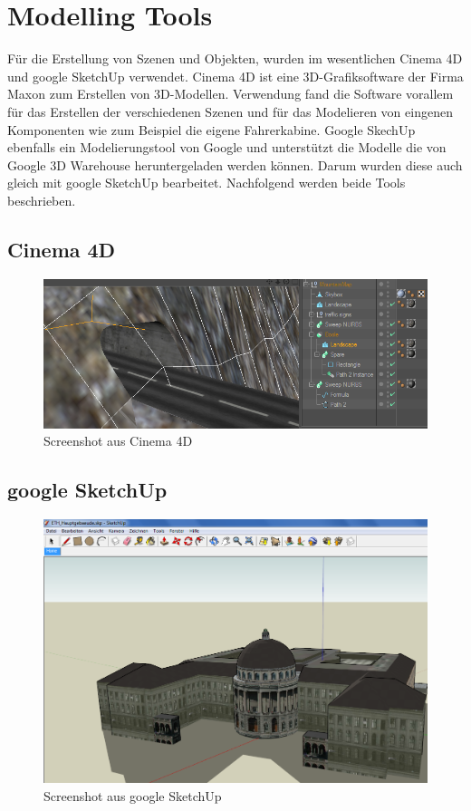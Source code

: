 \section{Modelling Tools}
Für die Erstellung von Szenen und Objekten, wurden im wesentlichen Cinema 4D und google SketchUp verwendet. Cinema 4D ist eine 3D-Grafiksoftware der Firma Maxon zum Erstellen von 3D-Modellen. Verwendung fand die Software vorallem für das Erstellen der verschiedenen Szenen und für das Modelieren von eingenen Komponenten wie zum Beispiel die eigene Fahrerkabine. Google SkechUp ebenfalls ein Modelierungstool von Google und unterstützt die Modelle die von Google 3D Warehouse heruntergeladen werden können. Darum wurden diese auch gleich mit google SketchUp bearbeitet. Nachfolgend werden beide Tools beschrieben.
\subsection{Cinema 4D}
\begin{figure}[H]
\centering 
\includegraphics[width=1\linewidth]{src/screenshot_cinema4d.png}
\caption{Screenshot aus Cinema 4D} %
\label{screenshot_cinema4d} %
\end{figure}
\subsection{google SketchUp}\begin{figure}[H]
\centering 
\includegraphics[width=1\linewidth]{src/screenshot_googlesketchup.png}
\caption{Screenshot aus google SketchUp} %
\label{screenshot_googlesketchup} %
\end{figure}